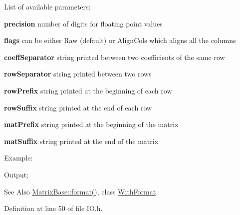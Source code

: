 List of available parameters\-:
\begin{DoxyItemize}
\item {\bfseries precision} number of digits for floating point values
\item {\bfseries flags} can be either Raw (default) or Align\-Cols which aligns all the columns
\item {\bfseries coeff\-Separator} string printed between two coefficients of the same row
\item {\bfseries row\-Separator} string printed between two rows
\item {\bfseries row\-Prefix} string printed at the beginning of each row
\item {\bfseries row\-Suffix} string printed at the end of each row
\item {\bfseries mat\-Prefix} string printed at the beginning of the matrix
\item {\bfseries mat\-Suffix} string printed at the end of the matrix
\end{DoxyItemize}

Example\-:
\begin{DoxyCodeInclude}
\end{DoxyCodeInclude}
 Output\-:
\begin{DoxyVerbInclude}
\end{DoxyVerbInclude}


\begin{DoxySeeAlso}{See Also}
\hyperlink{class_matrix_base_a450797ce64a44162dfd4a0cbb4ea6f16}{Matrix\-Base\-::format()}, class \hyperlink{class_with_format}{With\-Format} 
\end{DoxySeeAlso}


Definition at line 50 of file I\-O.\-h.



